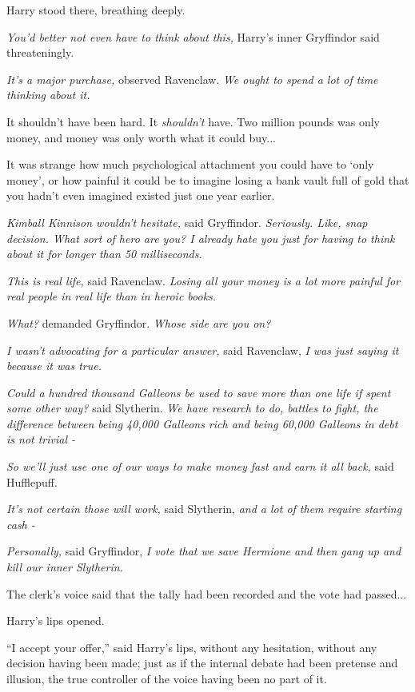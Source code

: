 Harry stood there, breathing deeply.

\emph{You'd better not even have to think about this,} Harry's inner Gryffindor said threateningly.

\emph{It's a major purchase,} observed Ravenclaw. \emph{We ought to spend a lot of time thinking about it.}

It shouldn't have been hard. It \emph{shouldn't} have. Two million pounds was only money, and money was only worth what it could buy...

It was strange how much psychological attachment you could have to `only money', or how painful it could be to imagine losing a bank vault full of gold that you hadn't even imagined existed just one year earlier.

\emph{Kimball Kinnison wouldn't hesitate,} said Gryffindor. \emph{Seriously. Like, snap decision. What sort of hero are you? I already hate you just for having to think about it for longer than 50 milliseconds.}

\emph{This is real life,} said Ravenclaw. \emph{Losing all your money is a lot more painful for real people in real life than in heroic books.}

\emph{What?} demanded Gryffindor. \emph{Whose side are you on?}

\emph{I wasn't advocating for a particular answer,} said Ravenclaw, \emph{I was just saying it because it was true.}

\emph{Could a hundred thousand Galleons be used to save more than one life if spent some other way?} said Slytherin. \emph{We have research to do, battles to fight, the difference between being 40,000 Galleons rich and being 60,000 Galleons in debt is not trivial -}

\emph{So we'll just use one of our ways to make money fast and earn it all back,} said Hufflepuff.

\emph{It's not certain those will work,} said Slytherin, \emph{and a lot of them require starting cash -}

\emph{Personally,} said Gryffindor, \emph{I vote that we save Hermione and then gang up and kill our inner Slytherin.}

The clerk's voice said that the tally had been recorded and the vote had passed...

Harry's lips opened.

``I accept your offer,'' said Harry's lips, without any hesitation, without any decision having been made; just as if the internal debate had been pretense and illusion, the true controller of the voice having been no part of it.

